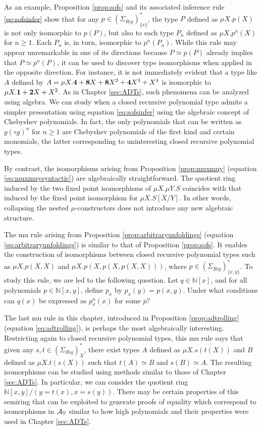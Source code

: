 \documentclass{msthesis}
\theoremstyle{definition}
\newcommand{\nat}{\mathbb{N}}
\begin{document}
As an example, Proposition \ref{prop:sofs} and its associated inference rule \eqref{eq:sofsinfer} show that for any $p \in (\Sigma_{Rig})^*_{\{x\}}$, the type $P$ defined as $\mu X.p(X)$ is not only isomorphic to $p(P)$, but also to each type $P_n$ defined as $\mu X.p^n(X)$ for $n \ge 1$.  Each $P_n$ is, in turn, isomorphic to $p^n(P_n)$.  While this rule may appear unremarkable in one of its directions because $P \simeq p(P)$ already implies that $P \simeq p^n(P)$, it can be used to discover type isomorphisms when applied in the opposite direction.  For instance, it is not immediately evident that a type like $A$ defined by $A = \mu X. \mathbf{4} + \mathbf{8} X + \mathbf{8} X^2 + \mathbf{4} X^3 + X^4$ is isomorphic to $\mu X.\mathbf{1} + \mathbf{2}X + X^2$.  As in Chapter \ref{sec:ADTs}, such phenomena can be analyzed using algebra. We can study when a closed recursive polynomial type admits a simpler presentation using equation \eqref{eq:sofsinfer} using the algebraic concept of Chebyshev polynomials.  In fact, the only polynomials that can be written as $g (\circ g)^n$ for $n \ge 1$ are Chebyshev polynomials of the first kind and certain monomials, the latter corresponding to uninteresting closed recursive polynomial types.

By contrast, the isomorphisms arising from Proposition \ref{prop:muxmuy} (equation \eqref{eq:muxmuysyntactic}) are algebraically straightforward.  The quotient ring induced by the two fixed point isomorphisms of $\mu X.\mu Y.S$ coincides with that induced by the fixed point isomorphism for $\mu X.S[X/Y]$.  In other words, collapsing the nested $\mu$-constructors does not introduce any new algebraic structure.

The mu rule arising from Proposition \ref{prop:arbitraryunfoldings} (equation \ref{eq:arbitraryunfoldings}) is similar to that of Proposition \ref{prop:sofs}. It enables the construction of isomorphisms between closed recursive polynomial types such as $\mu X.p(X,X)$ and $\mu X.p(X,p(X, p(X, X)))$, where $p \in (\Sigma_{Rig})^*_{\{x,y\}}$.  To study this rule, we are led to the following question.  Let $q \in \nat[x]$, and for all polynomials $p \in \nat[x,y]$, define $p_x$ by $p_x(y) = p(x,y)$. Under what conditions can $q(x)$ be expressed as $p_x^n(x)$ for some $p$?

The last mu rule in this chapter, introduced in Proposition \ref{prop:adtrolling} (equation \ref{eq:adtrolling}), is perhaps the most algebraically interesting.  Restricting again to closed recursive polynomial types, this mu rule says that given any $s, t \in (\Sigma_{Rig})^*_X$, there exist types $A$ defined as $\mu X.s(t(X))$ and $B$ defined as $\mu X.t(s(X))$ such that $t(A) \simeq B$ and $s(B) \simeq A$.  The resulting isomorphisms can be studied using methods similar to those of Chapter \ref{sec:ADTs}.  In particular, we can consider the quotient ring $\nat[x,y]/(y = t(x), x = s(y))$.  There may be certain properties of this semiring that can be exploited to generate proofs of equality which correspond to isomorphisms in $\mathcal{A}_{\mathbb{V}}$ similar to how high polynomials and their properties were used in Chapter \ref{sec:ADTs}.
\end{document}
